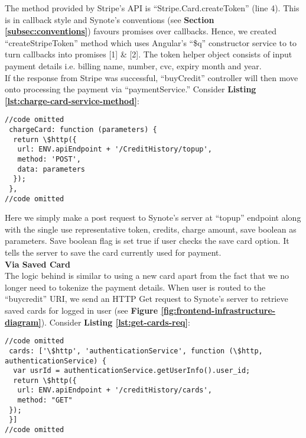The method provided by Stripe’s API is “Stripe.Card.createToken” (line 4). This is in callback style and Synote’s conventions (see \textbf{Section \ref{subsec:conventions}}) favours promises over callbacks. Hence, we created “createStripeToken” method which uses Angular’s “\$q” constructor service to to turn callbacks into promises [1] \& [2]. The token helper object consists of input payment details i.e. billing name, number, cvc, expiry month and year.\\ 
 
If the response from Stripe was successful, “buyCredit” controller will then move onto processing the payment via “paymentService.” Consider \textbf{Listing \ref{lst:charge-card-service-method}}:\\

\begin{listing}[H]
\begin{verbatim}
//code omitted    
 chargeCard: function (parameters) {
  return \$http({
   url: ENV.apiEndpoint + '/CreditHistory/topup',
   method: 'POST',
   data: parameters
  });
 },
//code omitted   
\end{verbatim}
\label{lst:charge-card-service-method}
\end{listing} 
 
Here we simply make a post request to Synote’s server at “topup” endpoint along with the single use representative token, credits, charge amount, save boolean as parameters. Save boolean flag is set true if user checks the save card option. It tells the server to save the card currently used for payment.\\ 

\textbf{Via Saved Card}\\
The logic behind is similar to using a new card apart from the fact that we no longer need to tokenize the payment details. When user is routed to the “buycredit” URI, we send an HTTP Get request to Synote’s server to retrieve saved cards for logged in user (see \textbf{Figure \ref{fig:frontend-infrastructure-diagram}}). Consider \textbf{Listing \ref{lst:get-cards-req}}:\\

\begin{listing}[H]
\begin{verbatim}
//code omitted    
 cards: ['\$http', 'authenticationService', function (\$http, authenticationService) {
  var usrId = authenticationService.getUserInfo().user_id;
  return \$http({
   url: ENV.apiEndpoint + '/creditHistory/cards',
   method: "GET"
 });
 }]
//code omitted   
\end{verbatim}
\label{lst:get-cards-req}
\end{listing} 











